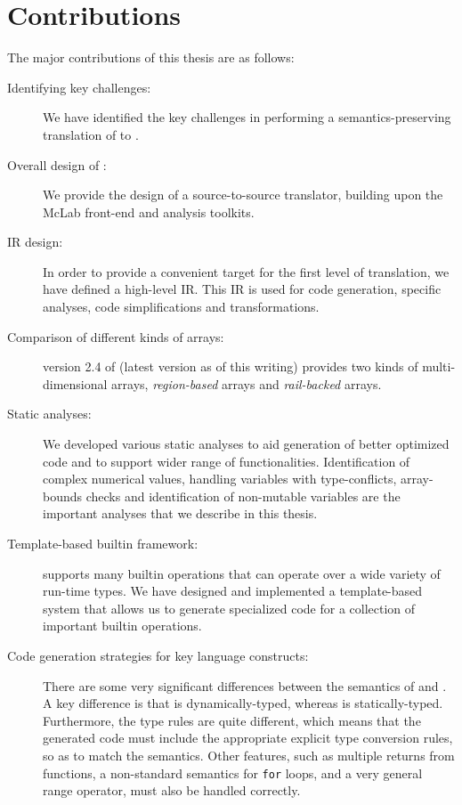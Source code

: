 \section{Contributions}
  
The major contributions  of this thesis are as follows:

\begin{description}

\item[Identifying key challenges:] We have identified the key challenges
in performing a semantics-preserving translation of \matlab to \xten.

\item[Overall design of \mixten:] We provide the design of a 
source-to-source translator, building upon the McLab front-end and
analysis toolkits.

\item[\mixten IR design:] In order to provide a convenient
target for the first level of translation, we have defined a high-level
\mixten IR.  This IR is used for code generation, \xten specific analyses, 
code simplifications and transformations.

\item[Comparison of different kinds of \xten arrays:] version 2.4 of \xten 
(latest version as of this writing) provides two kinds of multi-dimensional 
arrays, \emph{region-based} arrays and \emph{rail-backed} arrays.  

\item[Static analyses:] We developed various static analyses to aid generation
of better optimized code and to support wider range of \matlab functionalities.
Identification of complex numerical values, handling variables with	
type-conflicts, array-bounds checks and identification of non-mutable variables
are the important analyses that we describe in this thesis.

\item[Template-based builtin framework:] \matlab supports many builtin
operations that can operate over a wide variety of run-time types.  We
have designed and implemented a template-based system that allows us to
generate specialized \xten code for a collection of important builtin
operations.

\item[Code generation strategies for key language constructs:]  There
are some very significant differences between the semantics of \matlab
and \xten.  A key difference is that \matlab is dynamically-typed,
whereas \xten is statically-typed.   Furthermore, the type rules are
quite different, which means that the generated \xten code must include
the appropriate explicit type conversion rules, so as to match the
\matlab semantics.   Other \matlab features, such as multiple returns
from functions, a non-standard semantics for \texttt{for} loops, and a
very general range operator, must also be handled correctly.


\end{description}
